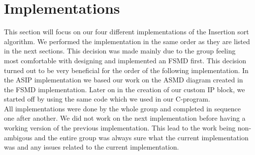 \documentclass[conference]{IEEEtran}
\begin{document}
\section{Implementations}
This section will focus on our four different implementations of the Insertion sort algorithm. We performed the implementation in the same order as they are listed in the next sections. This decision was made mainly due to the group feeling most comfortable with designing and implemented an FSMD first. This decision turned out to be very beneficial for the order of the following implementation. In the ASIP implementation we based our work on the ASMD diagram created in the FSMD implementation. Later on in the creation of our custom IP block, we started off by using the same code which we used in our C-program. \\
All implementations were done by the whole group and completed in sequence one after another. We did not work on the next implementation before having a working version of the previous implementation. This lead to the work being non-ambigous and the entire group was always sure what the current implementation was and any issues related to the current implementation.
\end{document}

